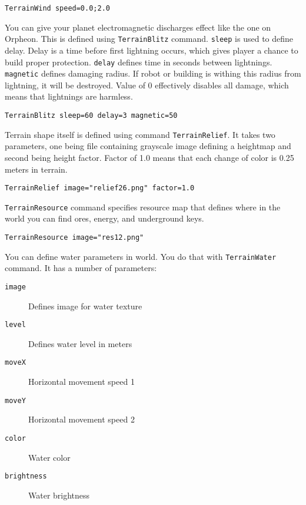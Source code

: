 \begin{lstlisting}[style=scene]
TerrainWind speed=0.0;2.0
\end{lstlisting}


You can give your planet electromagnetic discharges effect like the one on Orpheon. This is defined using \texttt{TerrainBlitz} command. \texttt{sleep} is used to define delay. Delay is a time before first lightning occurs, which gives player a chance to build proper protection. \texttt{delay} defines time in seconds between lightnings. \texttt{magnetic} defines damaging radius. If robot or building is withing this radius from lightning, it will be destroyed. Value of 0 effectively disables all damage, which means that lightnings are harmless.

\begin{lstlisting}[style=scene]
TerrainBlitz sleep=60 delay=3 magnetic=50
\end{lstlisting}

Terrain shape itself is defined using command \texttt{TerrainRelief}. It takes two parameters, one being file containing grayscale image defining a heightmap and second being height factor. Factor of 1.0 means that each change of color is 0.25 meters in terrain.

\begin{lstlisting}[style=scene]
TerrainRelief image="relief26.png" factor=1.0
\end{lstlisting}

\texttt{TerrainResource} command specifies resource map that defines where in the world you can find ores, energy, and underground keys.

\begin{lstlisting}[style=scene]
TerrainResource image="res12.png"
\end{lstlisting}

You can define water parameters in world. You do that with \texttt{TerrainWater} command. It has a number of parameters:

\begin{description}
    \item[\texttt{image}] Defines image for water texture
    \item[\texttt{level}] Defines water level in meters
    \item[\texttt{moveX}] Horizontal movement speed 1
    \item[\texttt{moveY}] Horizontal movement speed 2
    \item[\texttt{color}] Water color
    \item[\texttt{brightness}] Water brightness
\end{description}

